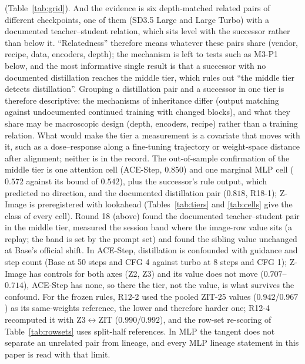 \documentclass[11pt]{article}
\newcommand{\TT}{ZIT-25}%
\begin{document}
(Table~\ref{tab:grid}). And the evidence is six depth-matched related pairs of different checkpoints, one of them (SD3.5 Large and Large Turbo) with a documented teacher--student relation, which sits level with the successor rather than below it. ``Relatedness'' therefore means whatever these pairs share (vendor, recipe, data, encoders, depth); the mechanism is left to tests such as M3-P1 below, and the most informative single result is that a successor with no documented distillation reaches the middle tier, which rules out ``the middle tier detects distillation''. Grouping a distillation pair and a successor in one tier is therefore descriptive: the mechanisms of inheritance differ (output matching against undocumented continued training with changed blocks), and what they share may be macroscopic design (depth, encoders, recipe) rather than a training relation. What would make the tier a measurement is a covariate that moves with it, such as a dose--response along a fine-tuning trajectory or weight-space distance after alignment; neither is in the record. The out-of-sample confirmation of the middle tier is one attention cell (ACE-Step, $0.850$) and one marginal MLP cell ($0.572$ against its bound of $0.542$), plus the successor's rule output, which predicted no direction, and the documented distillation pair ($0.818$, R18-1); Z-Image is preregistered with lookahead (Tables~\ref{tab:tiers} and \ref{tab:cells} give the class of every cell). Round 18 (above) found the documented teacher--student pair in the middle tier, measured the session band where the image-row value sits (a replay; the band is set by the prompt set) and found the sibling value unchanged at Base's official shift. In ACE-Step, distillation is confounded with guidance and step count (Base at 50 steps and CFG 4 against turbo at 8 steps and CFG 1); Z-Image has controls for both axes (Z2, Z3) and its value does not move ($0.707$--$0.714$), ACE-Step has none, so there the tier, not the value, is what survives the confound. For the frozen rules, R12-2 used the pooled \TT{} values ($0.942$/$0.967$) as its same-weights reference, the lower and therefore harder one; R12-4 recomputed it with Z3$\leftrightarrow$ZIT ($0.990$/$0.992$), and the row-set re-scoring of Table~\ref{tab:rowsets} uses split-half references. In MLP the tangent does not separate an unrelated pair from lineage, and every MLP lineage statement in this paper is read with that limit.
\end{document}
